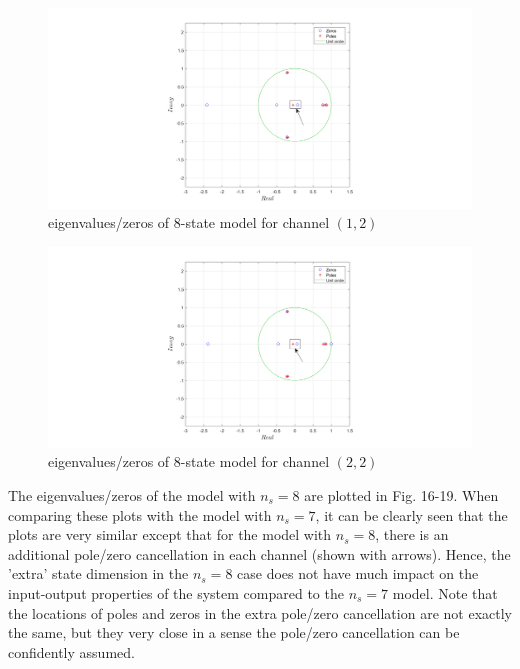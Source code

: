 \documentclass[paper=US leter, fontsize=11pt]{scrartcl}
\begin{document}
\begin{figure}[ht!]  
	\centering    
	\includegraphics[scale=0.38,trim={4.5cm 0 0 0},clip]{task252.png}  
	\caption{eigenvalues/zeros of 8-state model for channel $(1,2)$}
	\label{task253} 
\end{figure} 

\begin{figure}[t!]  
	\centering    
	\includegraphics[scale=0.38,trim={4.5cm 0 0 0},clip]{task254.png}  
	\caption{eigenvalues/zeros of 8-state model for channel $(2,2)$}
	\label{task254} 
\end{figure} 
\clearpage
The eigenvalues/zeros of the model with $n_{s}=8$ are plotted in Fig. 16-19. When comparing these plots with the model with $n_{s}=7$, it can be clearly seen that the plots are very similar except that for the model with $n_{s}=8$, there is an additional pole/zero cancellation in each channel (shown with arrows). Hence, the 'extra' state dimension in the $n_{s} = 8$ case does not have much impact on the input-output properties of the system compared to the $n_{s} = 7$ model. Note that the locations of poles and zeros in the extra pole/zero cancellation are not exactly the same, but they very close in a sense the pole/zero cancellation can be confidently assumed.
\end{document}
